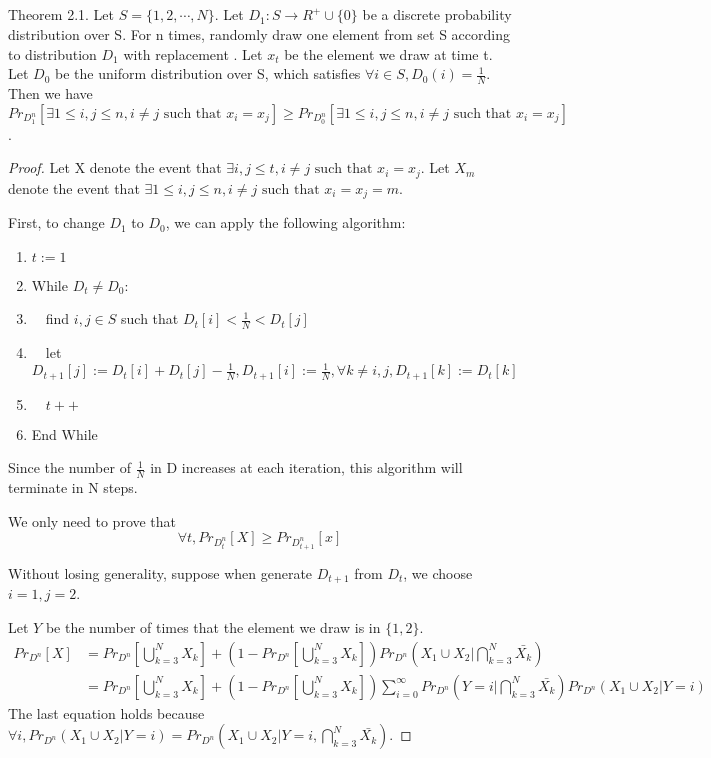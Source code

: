 \documentclass{article}
\begin{document}
\begin{spacing}{1.1}
    \section{}
    Theorem 2.1. Let $S = \{1, 2, \cdots, N\}$. Let $D_1: S\to R^+\cup \{0\}$ be a discrete probability distribution over S. For n times, randomly draw one element from set S according to distribution $D_1$ with replacement . Let $x_t$ be the element we draw at time t. Let $D_0$ be the uniform distribution over S, which satisfies $\forall i \in S, D_0(i) = \frac{1}{N}$. Then we have
    $$Pr_{D_1^n}[\exists 1\leq i, j \leq n, i\not = j \text{ such that } x_i = x_j] \geq Pr_{D_0^n}[\exists 1\leq i, j \leq n, i\not = j \text{ such that } x_i = x_j]$$.
    \begin{proof}
        Let X denote the event that $\exists i, j \leq t, i\not = j \text{ such that } x_i = x_j$. Let $X_m$ denote the event that $\exists 1\leq i, j \leq n, i\not = j \text{ such that } x_i = x_j = m$.

        First, to change $D_1$ to $D_0$, we can apply the following algorithm:
        \begin{enumerate}
            \item $t := 1$
            \item While $D_t \not = D_0$:
            \item $\quad$find $i, j \in S$ such that $D_t[i] < \frac{1}{N} < D_t[j]$
            \item $\quad$let $D_{t+1}[j] := D_t[i] + D_t[j] - \frac{1}{N}, D_{t+1}[i] := \frac{1}{N}, \forall k \not = i, j, D_{t+1}[k] := D_t[k]$
            \item $\quad t++$
            \item End While
        \end{enumerate}
        Since the number of $\frac{1}{N}$ in D increases at each iteration, this algorithm will terminate in N steps.

        We only need to prove that $$\forall t, Pr_{D_t^n}[X] \geq Pr_{D_{t+1}^n}[x]$$

        Without losing generality, suppose when generate $D_{t+1}$ from $D_t$, we choose $i = 1, j = 2$.

        Let $Y$ be the number of times that the element we draw is in $\{1, 2\}$.
        \begin{equation}
            \begin{aligned}
                Pr_{D^n}[X] &= Pr_{D^n}[\bigcup_{k = 3}^N X_k] + (1 - Pr_{D^n}[\bigcup_{k = 3}^N X_k])Pr_{D^n}(X_1\cup X_2 | \bigcap_{k = 3}^N \bar{X_k})\\
                &= Pr_{D^n}[\bigcup_{k = 3}^N X_k] + (1 - Pr_{D^n}[\bigcup_{k = 3}^N X_k])\sum_{i=0}^\infty Pr_{D^n}(Y = i | \bigcap_{k = 3}^N \bar{X_k}) Pr_{D^n}(X_1\cup X_2 | Y = i)
            \end{aligned}
        \end{equation}
        The last equation holds because $\forall i, Pr_{D^n}(X_1\cup X_2 | Y = i) = Pr_{D^n}(X_1\cup X_2 | Y = i, \bigcap_{k = 3}^N \bar{X_k})$.


\end{proof}
\end{spacing}
\end{document}
